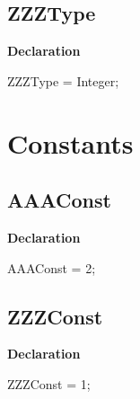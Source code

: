 \documentclass{report}
\begin{document}
\subsection*{ZZZType}
\begin{list}{}{
\setlength{\itemindent}{0cm}
\setlength{\listparindent}{0cm}
\setlength{\leftmargin}{\evensidemargin}
\addtolength{\leftmargin}{\tmplength}
\settowidth{\labelsep}{X}
\addtolength{\leftmargin}{\labelsep}
\setlength{\labelwidth}{\tmplength}
}
\begin{flushleft}
\item[\textbf{Declaration}\hfill]
\begin{ttfamily}
ZZZType = Integer;\end{ttfamily}


\end{flushleft}
\end{list}
\section{Constants}
\subsection*{AAAConst}
\begin{list}{}{
\setlength{\itemindent}{0cm}
\setlength{\listparindent}{0cm}
\setlength{\leftmargin}{\evensidemargin}
\addtolength{\leftmargin}{\tmplength}
\settowidth{\labelsep}{X}
\addtolength{\leftmargin}{\labelsep}
\setlength{\labelwidth}{\tmplength}
}
\begin{flushleft}
\item[\textbf{Declaration}\hfill]
\begin{ttfamily}
AAAConst = 2;\end{ttfamily}


\end{flushleft}
\end{list}
\subsection*{ZZZConst}
\begin{list}{}{
\setlength{\itemindent}{0cm}
\setlength{\listparindent}{0cm}
\setlength{\leftmargin}{\evensidemargin}
\addtolength{\leftmargin}{\tmplength}
\settowidth{\labelsep}{X}
\addtolength{\leftmargin}{\labelsep}
\setlength{\labelwidth}{\tmplength}
}
\begin{flushleft}
\item[\textbf{Declaration}\hfill]
\begin{ttfamily}
ZZZConst = 1;\end{ttfamily}


\end{flushleft}
\end{list}
\end{document}
